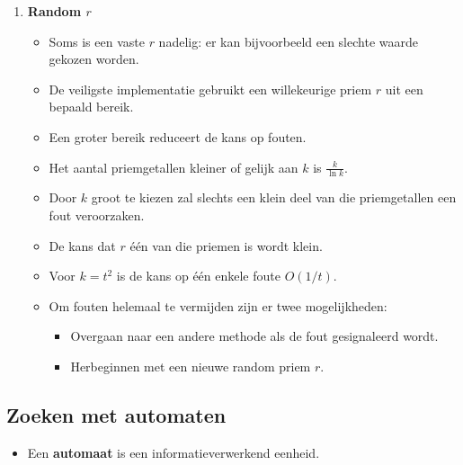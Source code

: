 \begin{itemize}
\begin{enumerate}
            \item \textbf{Random $r$}
            \begin{itemize}
                \item Soms is een vaste $r$ nadelig: er kan bijvoorbeeld een slechte waarde gekozen worden.
                \item De veiligste implementatie gebruikt een willekeurige priem $r$ uit een bepaald bereik.
                \item Een groter bereik reduceert de kans op fouten.
                \item Het aantal priemgetallen kleiner of gelijk aan $k$ is $\frac{k}{\ln k}$.
                \item Door $k$ groot te kiezen zal slechts een klein deel van die priemgetallen een fout veroorzaken.
                \item De kans dat $r$ één van die priemen is wordt klein.
                \item Voor $k = t^2$ is de kans op één enkele foute $O(1/t)$.
                \item Om fouten helemaal te vermijden zijn er twee mogelijkheden:
                \begin{itemize}
                    \item Overgaan naar een andere methode als de fout gesignaleerd wordt.
                    \item Herbeginnen met een nieuwe random priem $r$.
                \end{itemize}
            \end{itemize}
        \end{enumerate}

    

\end{itemize}


\subsection{Zoeken met automaten}
\begin{itemize}
    \item Een \textbf{automaat} is een informatieverwerkend eenheid.
\end{itemize}
